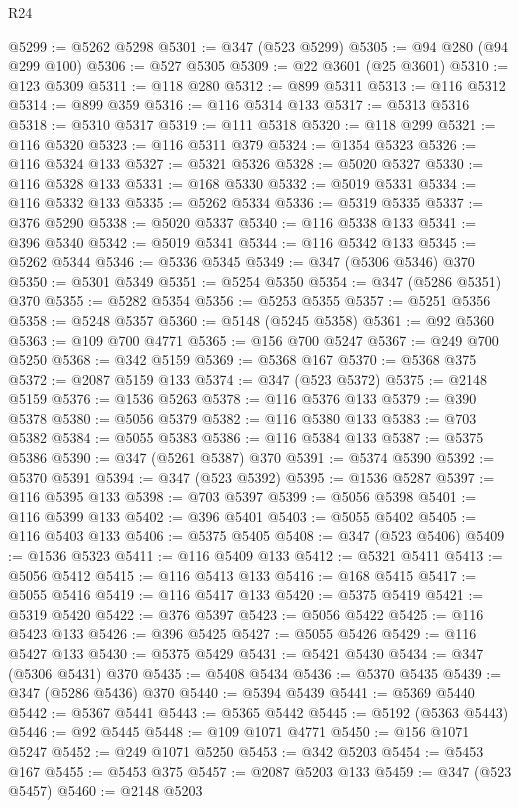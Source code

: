 \begin{lexlean}{R24}
\begin{coremodule}
{{{{{{{{{{{{{{{{{{{{{{{{{{{{{{{{{{{{{{{{{{{{{{{{{{{{{{{{{{{{{{{{{{{{{{{{{{{{{{{{{{{{{{{{{{{{{{{{{{{{{{{{{{{{{{{{{{{{{{{{{{{{{{{{{{{{{{{{{{{{{{{{{{{{{{{{{{{{{{{{{{{{{{{{{{{{{{{{{{{{{{{{{{{{{{{{{{{@5299 := @5262 @5298
@5301 := @347 (@523 @5299)
@5305 := @94 @280 (@94 @299 @100)
@5306 := @527 @5305
@5309 := @22 @3601 (@25 @3601)
@5310 := @123 @5309
@5311 := @118 @280
@5312 := @899 @5311
@5313 := @116 @5312
@5314 := @899 @359
@5316 := @116 @5314 @133
@5317 := @5313 @5316
@5318 := @5310 @5317
@5319 := @111 @5318
@5320 := @118 @299
@5321 := @116 @5320
@5323 := @116 @5311 @379
@5324 := @1354 @5323
@5326 := @116 @5324 @133
@5327 := @5321 @5326
@5328 := @5020 @5327
@5330 := @116 @5328 @133
@5331 := @168 @5330
@5332 := @5019 @5331
@5334 := @116 @5332 @133
@5335 := @5262 @5334
@5336 := @5319 @5335
@5337 := @376 @5290
@5338 := @5020 @5337
@5340 := @116 @5338 @133
@5341 := @396 @5340
@5342 := @5019 @5341
@5344 := @116 @5342 @133
@5345 := @5262 @5344
@5346 := @5336 @5345
@5349 := @347 (@5306 @5346) @370
@5350 := @5301 @5349
@5351 := @5254 @5350
@5354 := @347 (@5286 @5351) @370
@5355 := @5282 @5354
@5356 := @5253 @5355
@5357 := @5251 @5356
@5358 := @5248 @5357
@5360 := @5148 (@5245 @5358)
@5361 := @92 @5360
@5363 := @109 @700 @4771
@5365 := @156 @700 @5247
@5367 := @249 @700 @5250
@5368 := @342 @5159
@5369 := @5368 @167
@5370 := @5368 @375
@5372 := @2087 @5159 @133
@5374 := @347 (@523 @5372)
@5375 := @2148 @5159
@5376 := @1536 @5263
@5378 := @116 @5376 @133
@5379 := @390 @5378
@5380 := @5056 @5379
@5382 := @116 @5380 @133
@5383 := @703 @5382
@5384 := @5055 @5383
@5386 := @116 @5384 @133
@5387 := @5375 @5386
@5390 := @347 (@5261 @5387) @370
@5391 := @5374 @5390
@5392 := @5370 @5391
@5394 := @347 (@523 @5392)
@5395 := @1536 @5287
@5397 := @116 @5395 @133
@5398 := @703 @5397
@5399 := @5056 @5398
@5401 := @116 @5399 @133
@5402 := @396 @5401
@5403 := @5055 @5402
@5405 := @116 @5403 @133
@5406 := @5375 @5405
@5408 := @347 (@523 @5406)
@5409 := @1536 @5323
@5411 := @116 @5409 @133
@5412 := @5321 @5411
@5413 := @5056 @5412
@5415 := @116 @5413 @133
@5416 := @168 @5415
@5417 := @5055 @5416
@5419 := @116 @5417 @133
@5420 := @5375 @5419
@5421 := @5319 @5420
@5422 := @376 @5397
@5423 := @5056 @5422
@5425 := @116 @5423 @133
@5426 := @396 @5425
@5427 := @5055 @5426
@5429 := @116 @5427 @133
@5430 := @5375 @5429
@5431 := @5421 @5430
@5434 := @347 (@5306 @5431) @370
@5435 := @5408 @5434
@5436 := @5370 @5435
@5439 := @347 (@5286 @5436) @370
@5440 := @5394 @5439
@5441 := @5369 @5440
@5442 := @5367 @5441
@5443 := @5365 @5442
@5445 := @5192 (@5363 @5443)
@5446 := @92 @5445
@5448 := @109 @1071 @4771
@5450 := @156 @1071 @5247
@5452 := @249 @1071 @5250
@5453 := @342 @5203
@5454 := @5453 @167
@5455 := @5453 @375
@5457 := @2087 @5203 @133
@5459 := @347 (@523 @5457)
@5460 := @2148 @5203
}}}}}}}}}}}}}}}}}}}}}}}}}}}}}}}}}}}}}}}}}}}}}}}}}}}}}}}}}}}}}}}}}}}}}}}}}}}}}}}}}}}}}}}}}}}}}}}}}}}}}}}}}}}}}}}}}}}}}}}}}}}}}}}}}}}}}}}}}}}}}}}}}}}}}}}}}}}}}}}}}}}}}}}}}}}}}}}}}}}}}}}}}}}}}}}}}}}
\end{coremodule}
\end{lexlean}
